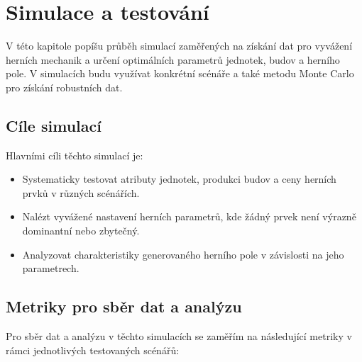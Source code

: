 \section{Simulace a testování}

V této kapitole popíšu průběh simulací zaměřených na získání dat pro vyvážení herních mechanik a určení optimálních parametrů jednotek, budov a herního pole. V simulacích budu využívat konkrétní scénáře a také metodu Monte Carlo pro získání robustních dat.

\subsection{Cíle simulací}

Hlavními cíli těchto simulací je:

\begin{itemize}
\item Systematicky testovat atributy jednotek, produkci budov a ceny herních prvků v různých scénářích.
\item Nalézt vyvážené nastavení herních parametrů, kde žádný prvek není výrazně dominantní nebo zbytečný.
\item Analyzovat charakteristiky generovaného herního pole v závislosti na jeho parametrech.
\end{itemize}

\subsection{Metriky pro sběr dat a analýzu}

Pro sběr dat a analýzu v těchto simulacích se zaměřím na následující metriky v rámci jednotlivých testovaných scénářů:

